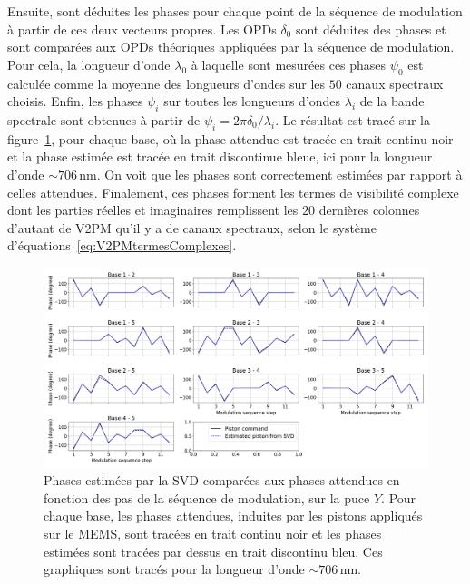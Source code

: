 Ensuite, sont déduites les phases pour chaque point de la séquence de modulation à partir de ces deux vecteurs propres. Les \ac{OPD}s $\delta_0$ sont déduites des phases et sont comparées aux \ac{OPD}s théoriques appliquées par la séquence de modulation. Pour cela, la longueur d'onde $\lambda_0$ à laquelle sont mesurées ces phases $\psi_0$ est calculée comme la moyenne des longueurs d'ondes sur les $50$ canaux spectraux choisis. Enfin, les phases $\psi_i$ sur toutes les longueurs d'ondes $\lambda_i$ de la bande spectrale sont obtenues à partir de $\psi_i = 2 \pi \delta_0 / \lambda_i$. Le résultat est tracé sur la figure~\ref{fig:PhaseEstimees}, pour chaque base, où la phase attendue est tracée en trait continu noir et la phase estimée est tracée en trait discontinue bleue, ici pour la longueur d'onde $\sim 706 \,$nm. On voit que les phases sont correctement estimées par rapport à celles attendues. Finalement, ces phases forment les termes de visibilité complexe dont les parties réelles et imaginaires remplissent les $20$ dernières colonnes d'autant de \ac{V2PM} qu'il y a de canaux spectraux, selon le système d'équations~\ref{eq:V2PMtermesComplexes}.

\begin{figure}[ht!]
    \centering
    \includegraphics[width=\figwidth]{Figure_Chap3/20221010_ModSeq_L874_EstPhase830_880_Pola1_Base_LaTex.png}
    \caption[Phases estimées par la SVD comparées aux phases attendues en fonction des pas de la séquence de modulation.]{Phases estimées par la SVD comparées aux phases attendues en fonction des pas de la séquence de modulation, sur la puce $Y$. Pour chaque base, les phases attendues, induites par les pistons appliqués sur le MEMS, sont tracées en trait continu noir et les phases estimées sont tracées par dessus en trait discontinu bleu. Ces graphiques sont tracés pour la longueur d'onde $\sim 706 \,$nm.}
    \label{fig:PhaseEstimees}
\end{figure}


